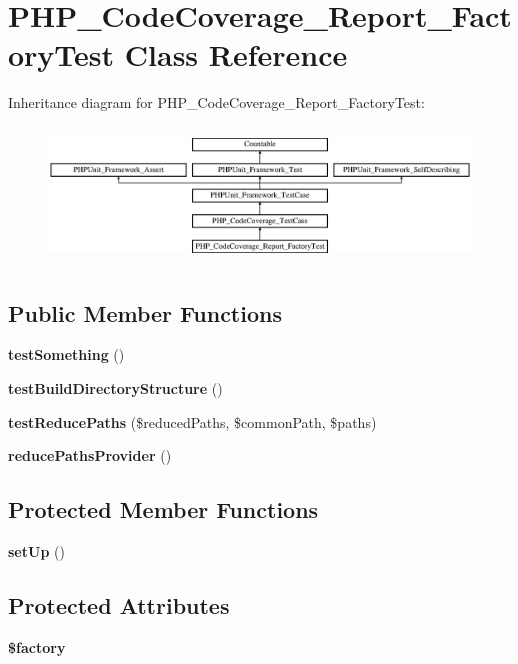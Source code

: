 \section{P\+H\+P\+\_\+\+Code\+Coverage\+\_\+\+Report\+\_\+\+Factory\+Test Class Reference}
\label{class_p_h_p___code_coverage___report___factory_test}
Inheritance diagram for P\+H\+P\+\_\+\+Code\+Coverage\+\_\+\+Report\+\_\+\+Factory\+Test\+:\begin{figure}[H]
\begin{center}
\leavevmode
\includegraphics[height=3.645833cm]{class_p_h_p___code_coverage___report___factory_test}
\end{center}
\end{figure}
\subsection*{Public Member Functions}
\begin{DoxyCompactItemize}
\item 
{\bf test\+Something} ()
\item 
{\bf test\+Build\+Directory\+Structure} ()
\item 
{\bf test\+Reduce\+Paths} (\$reduced\+Paths, \$common\+Path, \$paths)
\item 
{\bf reduce\+Paths\+Provider} ()
\end{DoxyCompactItemize}
\subsection*{Protected Member Functions}
\begin{DoxyCompactItemize}
\item 
{\bf set\+Up} ()
\end{DoxyCompactItemize}
\subsection*{Protected Attributes}
\begin{DoxyCompactItemize}
\item 
{\bf \$factory}
\end{DoxyCompactItemize}
